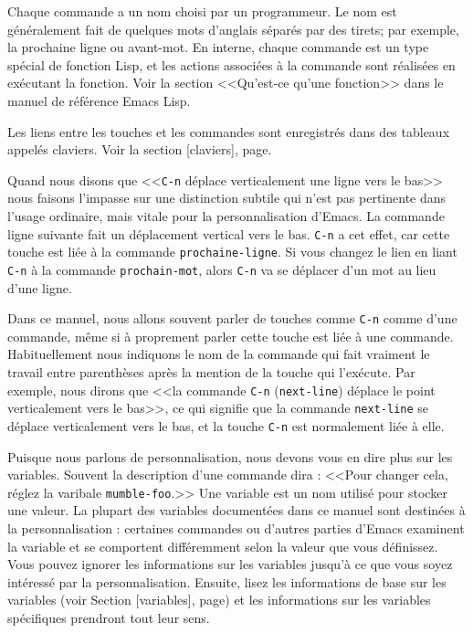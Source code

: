 Chaque commande a un nom choisi par un programmeur. Le nom est
généralement fait de quelques mots d'anglais séparés par des tirets;
par exemple, la prochaine ligne ou avant-mot. En interne, chaque
commande est un type spécial de fonction Lisp, et les actions
associées à la commande sont réalisées en exécutant la fonction. Voir
la section <<Qu'est-ce qu'une fonction>> dans le manuel de référence
Emacs Lisp.\par 

Les liens entre les touches et les commandes sont enregistrés dans des
tableaux appelés claviers. Voir la section
[claviers], page.\par 

Quand nous disons que <<\texttt{C-n} déplace verticalement une ligne
vers le bas>> nous faisons l'impasse sur une distinction subtile qui
n'est pas pertinente dans l'usage ordinaire, mais vitale pour la
personnalisation d'Emacs. La commande ligne suivante fait un
déplacement vertical vers le bas. \texttt{C-n} a cet effet, car cette
touche est liée à la commande \texttt{prochaine-ligne}. Si vous changez le lien
en liant \texttt{C-n} à la commande \texttt{prochain-mot}, alors \texttt{C-n}
va se déplacer d'un mot au lieu d'une ligne.\par 

Dans ce manuel, nous allons souvent parler de touches comme
\texttt{C-n} comme d'une commande, même si à proprement parler cette
touche est liée à une commande. Habituellement nous indiquons le nom
de la commande qui fait vraiment le travail entre parenthèses après la
mention de la touche qui l'exécute. Par exemple, nous dirons que <<la
commande \texttt{C-n} (\texttt{next-line}) déplace le point
verticalement vers le bas>>, ce qui signifie que la commande
\texttt{next-line} se déplace verticalement vers le bas, et la touche
\texttt{C-n} est normalement liée à elle.\par 

Puisque nous parlons de personnalisation, nous devons vous en dire
plus sur les variables. Souvent la description d'une commande dira :
<<Pour changer cela, réglez la varibale \texttt{mumble-foo}.>> Une
variable est un nom utilisé pour stocker une valeur. La plupart des
variables documentées dans ce manuel sont destinées à la
personnalisation : certaines commandes ou d'autres parties d'Emacs
examinent la variable et se comportent différemment selon la valeur que
vous définissez. Vous pouvez ignorer les informations sur les
variables jusqu'à ce que vous soyez intéressé par la
personnalisation. Ensuite, lisez les informations de base sur les
variables (voir Section [variables],
page) et les informations sur les variables
spécifiques prendront tout leur sens.\par
